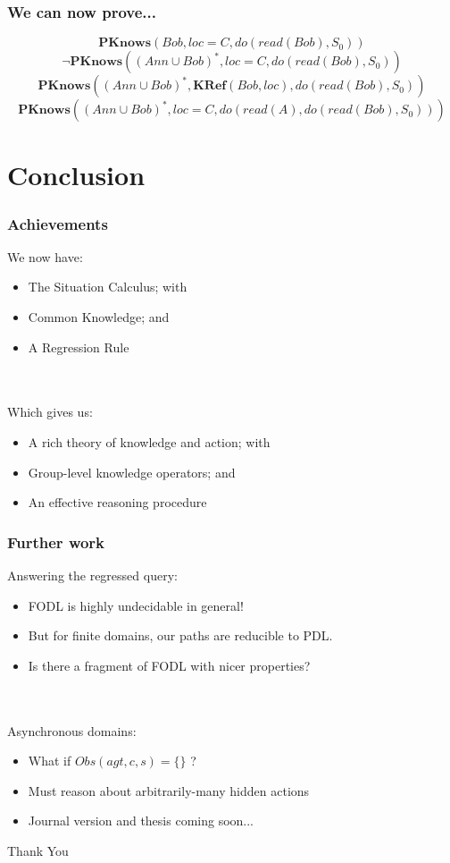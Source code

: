 \documentclass[compress]{beamer}
\newcommand{\PKnows}{\mathbf{PKnows}}
\begin{document}
\begin{frame}
\frametitle{We can now prove...}
\begin{equation*}
\PKnows(Bob,loc = C,do(read(Bob),S_0))
\end{equation*}
\pause
\begin{equation*}
\neg\PKnows((Ann \cup Bob)^*,loc = C,do(read(Bob),S_0))
\end{equation*}
\pause
\begin{equation*}
\PKnows((Ann \cup Bob)^*,\mathbf{KRef}(Bob,loc),do(read(Bob),S_0))
\end{equation*}
\pause
\begin{equation*}
\PKnows((Ann \cup Bob)^*,loc = C,do(read(A), do(read(Bob),S_0)))
\end{equation*}
\end{frame}

\section{Conclusion}

\begin{frame}
\frametitle{Achievements}
We now have:
\begin{itemize}
\item The Situation Calculus; with
\item Common Knowledge; and
\item A Regression Rule
\end{itemize}
\ \\
\ \\
\pause
Which gives us:
\begin{itemize}
\item A rich theory of knowledge and action; with
\item Group-level knowledge operators; and
\item An effective reasoning procedure
\end{itemize}
\end{frame}


\begin{frame}
\frametitle{Further work}
Answering the regressed query:
\begin{itemize}
\item FODL is highly undecidable in general!
\item But for finite domains, our paths are reducible to PDL.
\item Is there a fragment of FODL with nicer properties?
\end{itemize}
\ \\
\ \\
Asynchronous domains:
\begin{itemize}
\item What if $Obs(agt,c,s) = \{\}$ ?
\item Must reason about arbitrarily-many hidden actions
\pause
\item Journal version and thesis coming soon...
\end{itemize}
\end{frame}

\begin{frame}
\centering \large Thank You\\
\end{frame}
\end{document}
